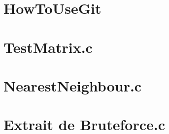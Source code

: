 \appendix

\chapter{HowToUseGit}
\lstset{style=classicstyle}


\chapter{TestMatrix.c}
\lstset{style=customc}


\chapter{NearestNeighbour.c}
\lstset{style=customc}


\chapter{Extrait de Bruteforce.c}
\lstset{style=customc}
